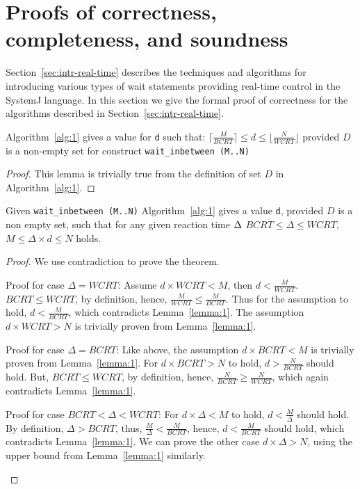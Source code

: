 \section{Proofs of correctness, completeness, and soundness}
\label{sec:proof-correctness}

Section~\ref{sec:intr-real-time} describes the techniques and algorithms
for introducing various types of wait statements providing real-time
control in the SystemJ language. In this section we give the formal
proof of correctness for the algorithms described in
Section~\ref{sec:intr-real-time}.

\begin{lemma}
  Algorithm~\ref{alg:1} gives a value for \texttt{d} such that: $\lceil
  \frac{M}{BCRT} \rceil \leq d \leq \lfloor \frac{N}{WCRT} \rfloor$
  provided $D$ is a non-empty set for construct \texttt{wait\_inbetween
    (M..N)}
\label{lemma:1}
\end{lemma}
\begin{proof}
  This lemma is trivially true from the definition of set $D$ in
  Algorithm~\ref{alg:1}.
\end{proof}

\begin{theorem}
	Given \texttt{wait\_inbetween (M..N)} Algorithm\-~\ref{alg:1} gives a
	value \texttt{d}, provided $D$ is a non empty set, such that for any
	given reaction time $\textcolor{black}{\Delta}$ 
	$BCRT\allowbreak \leq \Delta \leq WCRT$, $M \leq \Delta \times d \leq
	N$ holds.
\label{th:1}
\end{theorem}
\begin{proof}
  We use contradiction to prove the theorem.
  \begin{compactenum}[\hspace{0.25cm} 1.]
  \item Proof for case $\Delta = WCRT$: Assume $d \times WCRT <
      M$, then $d < \frac{M}{WCRT}$. $BCRT \leq WCRT$, by definition,
    hence, $\frac{M}{WCRT} \leq \frac{M}{BCRT}$. Thus for the assumption
    to hold, $d < \frac{M}{BCRT}$, which contradicts
    Lemma~\ref{lemma:1}. The assumption $d \times WCRT >N$ is trivially
    proven from Lemma~\ref{lemma:1}.
  \item Proof for case $\Delta = BCRT$: Like above, the assumption $d
    \times BCRT < M$ is trivially proven from Lemma~\ref{lemma:1}. For
    $d \times BCRT > N$ to hold, $d > \frac{N}{BCRT}$ should hold. But,
    $BCRT \leq WCRT$, by definition, hence, $\frac{N}{BCRT} \geq
    \frac{N}{WCRT}$, which again contradicts Lemma~\ref{lemma:1}.
  \item Proof for case $BCRT < \Delta < WCRT$: For $d \times \Delta < M$
    to hold, $d < \frac{M}{\Delta}$ should hold. By definition, $\Delta
    > BCRT$, thus, $\frac{M}{\Delta} < \frac{M}{BCRT}$, hence, $d <
    \frac{M}{BCRT}$ should hold, which contradicts
    Lemma~\ref{lemma:1}. We can prove the other case $d \times \Delta >
    N$, using the upper bound from Lemma~\ref{lemma:1} similarly.
  \end{compactenum}
\end{proof}

